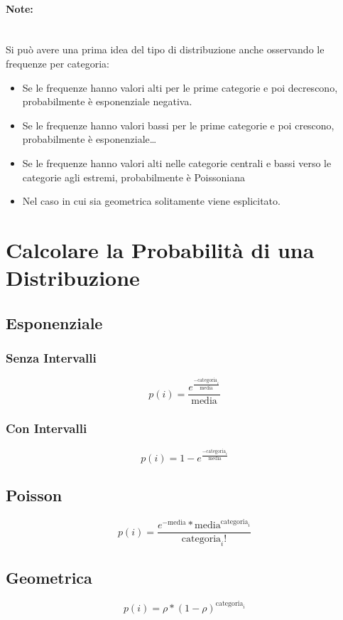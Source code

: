 \paragraph{Note:}\ \\
Si può avere una prima idea del tipo di distribuzione anche
osservando le frequenze per categoria:
\begin{itemize}
      \item Se le frequenze hanno valori alti per le prime categorie e poi
            decrescono, probabilmente è esponenziale negativa.
      \item Se le frequenze hanno valori bassi per le prime categorie e poi
            crescono, probabilmente è esponenziale\dots
      \item Se le frequenze hanno valori alti nelle categorie centrali e bassi
            verso le categorie agli estremi, probabilmente è Poissoniana
      \item Nel caso in cui sia geometrica solitamente viene esplicitato.
\end{itemize}

\section{Calcolare la Probabilità di una Distribuzione} \label{pi}

\subsection{Esponenziale}

\subsubsection{Senza Intervalli}

\[
      p(i) = \frac{e^{\frac{- \text{categoria}_i}{\text{media}}}}{\text{media}}
\]

\subsubsection{Con Intervalli}

\[
      p(i) = 1 - e^{\frac{- \text{categoria}_i}{\text{media}}}
\]

\subsection{Poisson}

\[
      p(i) = \frac{e^{- \text{media}} * \text{media}^{\text{categoria}_i}}{\text{categoria}_i !}
\]

\subsection{Geometrica}

\[
      p(i) = \rho * (1 - \rho)^{\text{categoria}_i}
\]